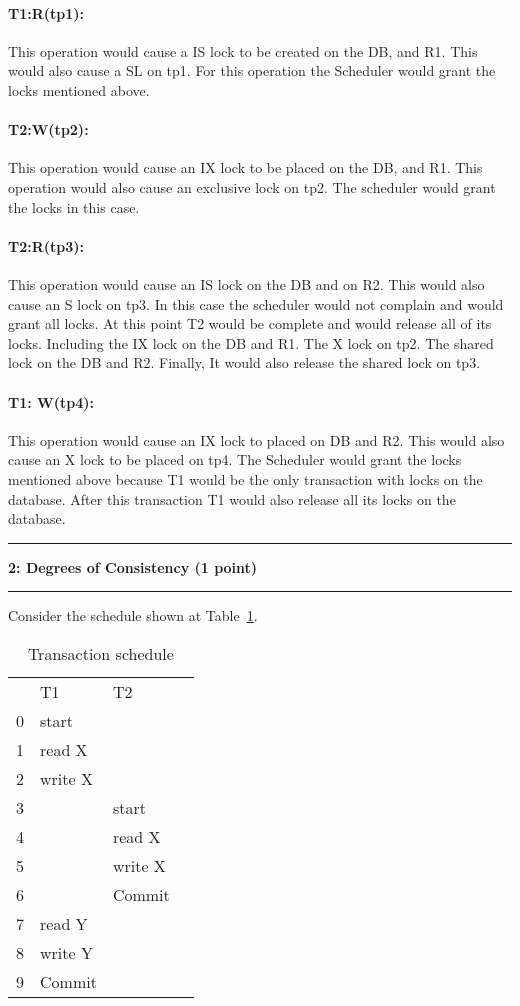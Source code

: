 \documentclass[11pt]{article}
\newcommand\question[2]{\vspace{.25in}\hrule\textbf{#1: #2}\vspace{.5em}\hrule\vspace{.10in}}
\begin{document}
\paragraph{T1:R(tp1):} This operation would cause a IS lock to be created on the DB, and R1. This would also cause a SL on tp1. For this operation the Scheduler would grant the locks mentioned above.\\

\paragraph{T2:W(tp2):} This operation would cause an IX lock to be placed on the DB, and R1. This operation would also cause an exclusive lock on tp2. The scheduler would grant the locks in this case.\\

\paragraph{T2:R(tp3):} This operation would cause an IS lock on the DB and on R2. This would also cause an S lock on tp3. In this case the scheduler would not complain and would grant all locks. At this point T2 would be complete and would release all of its locks. Including the IX lock on the DB and R1. The X lock on tp2. The shared lock on the DB and R2. Finally, It would also release the shared lock on tp3.\\

\paragraph{T1: W(tp4):} This operation would cause an IX lock to placed on DB and R2. This would also cause an X lock to be placed on tp4. The Scheduler would grant the locks mentioned above because T1 would be the only transaction with locks on the database. After this transaction T1 would also release all its locks on the database.\\

\question{2}{Degrees of Consistency (1 point)}
Consider the schedule shown at Table~\ref{schedule}.

\begin{table}[h!]
\begin{tabular}{ l |l |l |l |}
   &  T1 & T2 \\
  0 & start &   \\
  1 & read X &  \\
  2 & write X &   \\
  3 &  &  start \\
  4 &  &  read X \\
  5 &  &  write X \\
  6 &  &  Commit \\
  7 & read Y&  \\
  8 & write Y&  \\
  9 & Commit&  \\
\end{tabular}
\caption{Transaction schedule}
\label{schedule} 
\end{table}
\vspace{-1em} 
\end{document}
